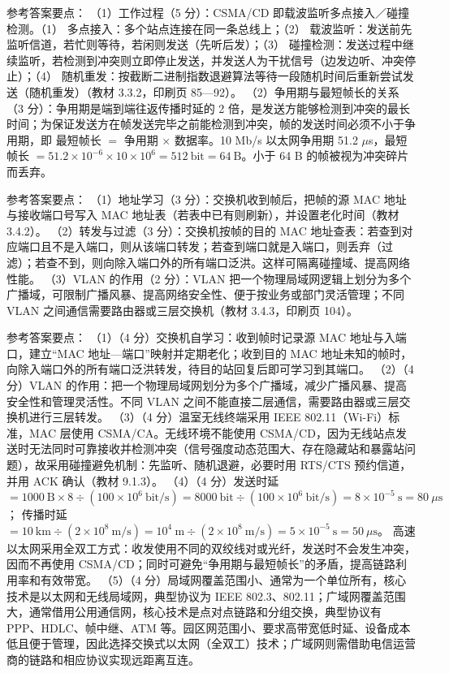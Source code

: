 \documentclass[a4paper,11pt]{article}
\begin{document}
\q 参考答案要点：
（1）工作过程（5 分）：CSMA/CD 即载波监听多点接入／碰撞检测。（1） 多点接入：多个站点连接在同一条总线上；（2） 载波监听：发送前先监听信道，若忙则等待，若闲则发送（先听后发）；（3） 碰撞检测：发送过程中继续监听，若检测到冲突则立即停止发送，并发送人为干扰信号（边发边听、冲突停止）；（4） 随机重发：按截断二进制指数退避算法等待一段随机时间后重新尝试发送（随机重发）（教材 3.3.2，印刷页 85—92）。
（2）争用期与最短帧长的关系（3 分）：争用期是端到端往返传播时延的 2 倍，是发送方能够检测到冲突的最长时间；为保证发送方在帧发送完毕之前能检测到冲突，帧的发送时间必须不小于争用期，即 最短帧长 $=$ 争用期 $\times$ 数据率。10 Mb/s 以太网争用期 51.2 $\mu$s，最短帧长 $=51.2\times10^{-6}\times10\times10^{6}=512\ \text{bit}=64\ \text{B}$。小于 64 B 的帧被视为冲突碎片而丢弃。

\q 参考答案要点：
（1）地址学习（3 分）：交换机收到帧后，把帧的源 MAC 地址与接收端口号写入 MAC 地址表（若表中已有则刷新），并设置老化时间（教材 3.4.2）。
（2）转发与过滤（3 分）：交换机按帧的目的 MAC 地址查表：若查到对应端口且不是入端口，则从该端口转发；若查到端口就是入端口，则丢弃（过滤）；若查不到，则向除入端口外的所有端口泛洪。这样可隔离碰撞域、提高网络性能。
（3）VLAN 的作用（2 分）：VLAN 把一个物理局域网逻辑上划分为多个广播域，可限制广播风暴、提高网络安全性、便于按业务或部门灵活管理；不同 VLAN 之间通信需要路由器或三层交换机（教材 3.4.3，印刷页 104）。


\q 参考答案要点：
（1）（4 分）交换机自学习：收到帧时记录源 MAC 地址与入端口，建立“MAC 地址—端口”映射并定期老化；收到目的 MAC 地址未知的帧时，向除入端口外的所有端口泛洪转发，待目的站回复后即可学习到其端口。
（2）（4 分）VLAN 的作用：把一个物理局域网划分为多个广播域，减少广播风暴、提高安全性和管理灵活性。不同 VLAN 之间不能直接二层通信，需要路由器或三层交换机进行三层转发。
（3）（4 分）温室无线终端采用 IEEE 802.11（Wi-Fi）标准，MAC 层使用 CSMA/CA。无线环境不能使用 CSMA/CD，因为无线站点发送时无法同时可靠接收并检测冲突（信号强度动态范围大、存在隐藏站和暴露站问题），故采用碰撞避免机制：先监听、随机退避，必要时用 RTS/CTS 预约信道，并用 ACK 确认（教材 9.1.3）。
（4）（4 分）发送时延 $=1000\ \text{B}\times8\div(100\times10^{6}\ \text{bit/s})=8000\ \text{bit}\div(100\times10^{6}\ \text{bit/s})=8\times10^{-5}\ \text{s}=80\ \mu\text{s}$；
传播时延 $=10\ \text{km}\div(2\times10^{8}\ \text{m/s})=10^{4}\ \text{m}\div(2\times10^{8}\ \text{m/s})=5\times10^{-5}\ \text{s}=50\ \mu\text{s}$。
高速以太网采用全双工方式：收发使用不同的双绞线对或光纤，发送时不会发生冲突，因而不再使用 CSMA/CD；同时可避免“争用期与最短帧长”的矛盾，提高链路利用率和有效带宽。
（5）（4 分）局域网覆盖范围小、通常为一个单位所有，核心技术是以太网和无线局域网，典型协议为 IEEE 802.3、802.11；广域网覆盖范围大，通常借用公用通信网，核心技术是点对点链路和分组交换，典型协议有 PPP、HDLC、帧中继、ATM 等。园区网范围小、要求高带宽低时延、设备成本低且便于管理，因此选择交换式以太网（全双工）技术；广域网则需借助电信运营商的链路和相应协议实现远距离互连。
\end{document}
